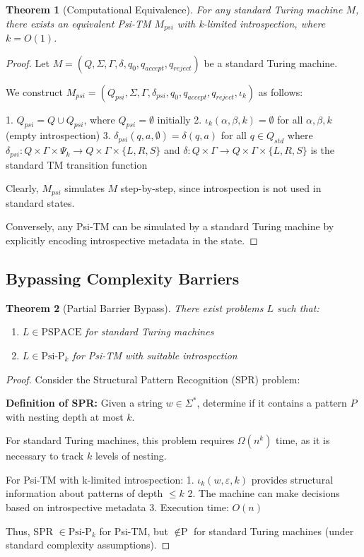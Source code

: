 \documentclass[11pt]{article}
\newtheorem{theorem}{Theorem}
\begin{document}
\begin{theorem}[Computational Equivalence]
For any standard Turing machine $M$, there exists an equivalent Psi-TM $M_{psi}$ with k-limited introspection, where $k = O(1)$.
\end{theorem}

\begin{proof}
Let $M = (Q, \Sigma, \Gamma, \delta, q_0, q_{accept}, q_{reject})$ be a standard Turing machine.

We construct $M_{psi} = (Q_{psi}, \Sigma, \Gamma, \delta_{psi}, q_0, q_{accept}, q_{reject}, \iota_k)$ as follows:

1. $Q_{psi} = Q \cup Q_{psi}$, where $Q_{psi} = \emptyset$ initially
2. $\iota_k(\alpha, \beta, k) = \emptyset$ for all $\alpha, \beta, k$ (empty introspection)
3. $\delta_{psi}(q, a, \emptyset) = \delta(q, a)$ for all $q \in Q_{std}$ where $\delta_{psi}: Q \times \Gamma \times \Psi_k \to Q \times \Gamma \times \{L, R, S\}$ and $\delta: Q \times \Gamma \to Q \times \Gamma \times \{L, R, S\}$ is the standard TM transition function

Clearly, $M_{psi}$ simulates $M$ step-by-step, since introspection is not used in standard states.

Conversely, any Psi-TM can be simulated by a standard Turing machine by explicitly encoding introspective metadata in the state.
\end{proof}

\subsection{Bypassing Complexity Barriers}

\begin{theorem}[Partial Barrier Bypass]
There exist problems $L$ such that:
\begin{enumerate}
\item $L \in \text{PSPACE}$ for standard Turing machines
\item $L \in \text{Psi-P}_k$ for Psi-TM with suitable introspection
\end{enumerate}
\end{theorem}

\begin{proof}
Consider the Structural Pattern Recognition (SPR) problem:

\textbf{Definition of SPR:} Given a string $w \in \Sigma^*$, determine if it contains a pattern $P$ with nesting depth at most $k$.

For standard Turing machines, this problem requires $\Omega(n^k)$ time, as it is necessary to track $k$ levels of nesting.

For Psi-TM with k-limited introspection:
1. $\iota_k(w, \varepsilon, k)$ provides structural information about patterns of depth $\leq k$
2. The machine can make decisions based on introspective metadata
3. Execution time: $O(n)$

Thus, SPR $\in \text{Psi-P}_k$ for Psi-TM, but $\notin \text{P}$ for standard Turing machines (under standard complexity assumptions).
\end{proof}
\end{document}
